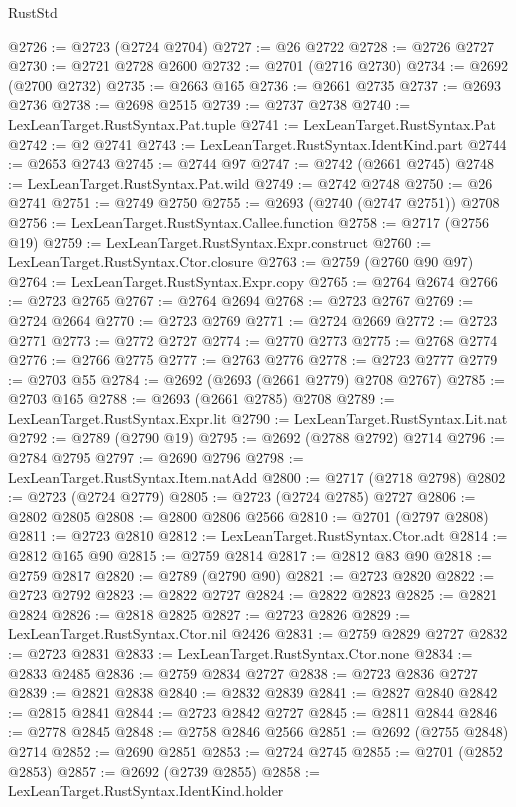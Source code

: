 \begin{lexlean}{RustStd}
\begin{coremodule}
@2726 := @2723 (@2724 @2704)
@2727 := @26 @2722
@2728 := @2726 @2727
@2730 := @2721 @2728 @2600
@2732 := @2701 (@2716 @2730)
@2734 := @2692 (@2700 @2732)
@2735 := @2663 @165
@2736 := @2661 @2735
@2737 := @2693 @2736
@2738 := @2698 @2515
@2739 := @2737 @2738
@2740 := LexLeanTarget.RustSyntax.Pat.tuple
@2741 := LexLeanTarget.RustSyntax.Pat
@2742 := @2 @2741
@2743 := LexLeanTarget.RustSyntax.IdentKind.part
@2744 := @2653 @2743
@2745 := @2744 @97
@2747 := @2742 (@2661 @2745)
@2748 := LexLeanTarget.RustSyntax.Pat.wild
@2749 := @2742 @2748
@2750 := @26 @2741
@2751 := @2749 @2750
@2755 := @2693 (@2740 (@2747 @2751)) @2708
@2756 := LexLeanTarget.RustSyntax.Callee.function
@2758 := @2717 (@2756 @19)
@2759 := LexLeanTarget.RustSyntax.Expr.construct
@2760 := LexLeanTarget.RustSyntax.Ctor.closure
@2763 := @2759 (@2760 @90 @97)
@2764 := LexLeanTarget.RustSyntax.Expr.copy
@2765 := @2764 @2674
@2766 := @2723 @2765
@2767 := @2764 @2694
@2768 := @2723 @2767
@2769 := @2724 @2664
@2770 := @2723 @2769
@2771 := @2724 @2669
@2772 := @2723 @2771
@2773 := @2772 @2727
@2774 := @2770 @2773
@2775 := @2768 @2774
@2776 := @2766 @2775
@2777 := @2763 @2776
@2778 := @2723 @2777
@2779 := @2703 @55
@2784 := @2692 (@2693 (@2661 @2779) @2708 @2767)
@2785 := @2703 @165
@2788 := @2693 (@2661 @2785) @2708
@2789 := LexLeanTarget.RustSyntax.Expr.lit
@2790 := LexLeanTarget.RustSyntax.Lit.nat
@2792 := @2789 (@2790 @19)
@2795 := @2692 (@2788 @2792) @2714
@2796 := @2784 @2795
@2797 := @2690 @2796
@2798 := LexLeanTarget.RustSyntax.Item.natAdd
@2800 := @2717 (@2718 @2798)
@2802 := @2723 (@2724 @2779)
@2805 := @2723 (@2724 @2785) @2727
@2806 := @2802 @2805
@2808 := @2800 @2806 @2566
@2810 := @2701 (@2797 @2808)
@2811 := @2723 @2810
@2812 := LexLeanTarget.RustSyntax.Ctor.adt
@2814 := @2812 @165 @90
@2815 := @2759 @2814
@2817 := @2812 @83 @90
@2818 := @2759 @2817
@2820 := @2789 (@2790 @90)
@2821 := @2723 @2820
@2822 := @2723 @2792
@2823 := @2822 @2727
@2824 := @2822 @2823
@2825 := @2821 @2824
@2826 := @2818 @2825
@2827 := @2723 @2826
@2829 := LexLeanTarget.RustSyntax.Ctor.nil @2426
@2831 := @2759 @2829 @2727
@2832 := @2723 @2831
@2833 := LexLeanTarget.RustSyntax.Ctor.none
@2834 := @2833 @2485
@2836 := @2759 @2834 @2727
@2838 := @2723 @2836 @2727
@2839 := @2821 @2838
@2840 := @2832 @2839
@2841 := @2827 @2840
@2842 := @2815 @2841
@2844 := @2723 @2842 @2727
@2845 := @2811 @2844
@2846 := @2778 @2845
@2848 := @2758 @2846 @2566
@2851 := @2692 (@2755 @2848) @2714
@2852 := @2690 @2851
@2853 := @2724 @2745
@2855 := @2701 (@2852 @2853)
@2857 := @2692 (@2739 @2855)
@2858 := LexLeanTarget.RustSyntax.IdentKind.holder

\end{coremodule}
\end{lexlean}
